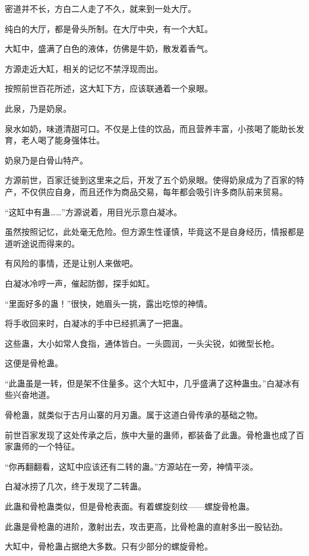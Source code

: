 
\begin{this_body}

密道并不长，方白二人走了不久，就来到一处大厅。

纯白的大厅，都是骨头所制。在大厅中央，有一个大缸。

大缸中，盛满了白色的液体，仿佛是牛奶，散发着香气。

方源走近大缸，相关的记忆不禁浮现而出。

按照前世百花所述，这大缸下方，应该联通着一个泉眼。

此泉，乃是奶泉。

泉水如奶，味道清甜可口。不仅是上佳的饮品，而且营养丰富，小孩喝了能助长发育，老人喝了能身强体壮。

奶泉乃是白骨山特产。

方源前世，百家迁徙到这里来之后，开发了五个奶泉眼。使得奶泉成为了百家的特产，不仅供应自身，而且还作为商品交易，每年都会吸引许多商队前来贸易。

“这缸中有蛊……”方源说着，用目光示意白凝冰。

虽然按照记忆，此处毫无危险。但方源生性谨慎，毕竟这不是自身经历，情报都是道听途说而得来的。

有风险的事情，还是让别人来做吧。

白凝冰冷哼一声，催起防御，探手如缸。

“里面好多的蛊！”很快，她眉头一挑，露出吃惊的神情。

将手收回来时，白凝冰的手中已经抓满了一把蛊。

这些蛊，大小如常人食指，通体皆白。一头圆润，一头尖锐，如微型长枪。

这便是骨枪蛊。

“此蛊虽是一转，但是架不住量多。这个大缸中，几乎盛满了这种蛊虫。”白凝冰有些兴奋地道。

骨枪蛊，就类似于古月山寨的月刃蛊。属于这道白骨传承的基础之物。

前世百家发现了这处传承之后，族中大量的蛊师，都装备了此蛊。骨枪蛊也成了百家蛊师的一个特征。

“你再翻翻看，这缸中应该还有二转的蛊。”方源站在一旁，神情平淡。

白凝冰捞了几次，终于发现了二转蛊。

此蛊和骨枪蛊类似，但是骨枪表面。有着螺旋刻纹——螺旋骨枪蛊。

此蛊是骨枪蛊的进阶，激射出去，攻击更高，比骨枪蛊的直射多出一股钻劲。

大缸中，骨枪蛊占据绝大多数。只有少部分的螺旋骨枪。


\end{this_body}

